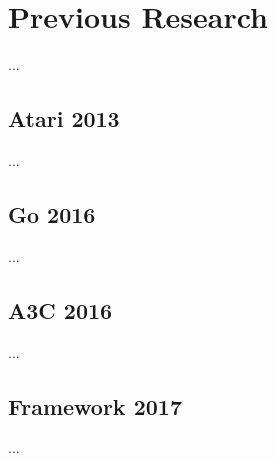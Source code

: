 \section{Previous Research}
...
\subsection{Atari 2013}
...
\subsection{Go 2016}
...
\subsection{A3C 2016}
...
\subsection{Framework 2017}
...